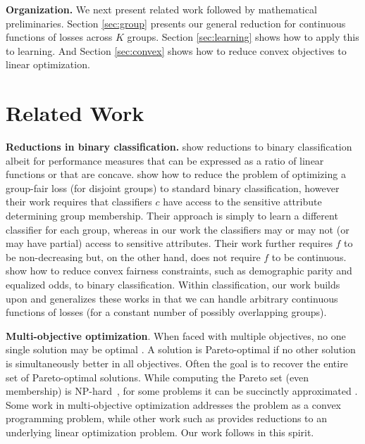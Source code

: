 \documentclass[final, 12pt]{colt2018} %
\begin{document}
\smallskip \noindent
\textbf{Organization.} We next present related work followed by mathematical preliminaries. Section \ref{sec:group} presents our general reduction for continuous functions of losses across $K$ groups. Section \ref{sec:learning} shows how to apply this to learning. And Section \ref{sec:convex} shows how to reduce convex objectives to linear optimization.


\section{Related Work}

\textbf{Reductions in binary classification.}
\cite{NarasimhanRS015} show reductions to binary classification albeit for
performance measures that can be expressed as a ratio of linear functions or that
are concave. \cite{dwork18a} show how to reduce the problem of optimizing a group-fair loss (for disjoint groups) to standard binary classification, however their work requires that classifiers $c$ have access to the sensitive attribute determining group membership. Their approach is simply to learn a different classifier for each group, whereas in our work the classifiers may or may not (or may have partial) access to sensitive attributes. Their work further requires $f$ to be non-decreasing but, on the other hand, does not require $f$ to be continuous.
\cite{Agarwal17, Agarwal18} show how to reduce convex fairness constraints, such as demographic parity and equalized odds, to binary classification.
 Within classification, our work builds upon and generalizes these works in that we can handle arbitrary continuous functions of
losses (for a constant number of possibly overlapping groups).

\medskip
\noindent
\textbf{Multi-objective optimization}.
When faced with multiple objectives, no one single solution may be optimal \citep[see, e.g.,][]{ZuluagaSKP13, RaviMRRH93, GrandoniRSZ14}. A solution is Pareto-optimal if no other solution is simultaneously better in all objectives. Often the goal is to recover the entire set of Pareto-optimal solutions. 
While computing the Pareto set (even membership) is NP-hard~\citep{RaviMRRH93}, 
for some problems it can be succinctly approximated \citep{warburton1987approximation, papadimitriou2000approximability, Diakonikolas:2011}. Some work in multi-objective optimization addresses the problem as a convex programming problem, while other work such as \cite{Diakonikolas:2011} provides reductions to an underlying linear optimization problem. Our work follows in this spirit.
\end{document}
